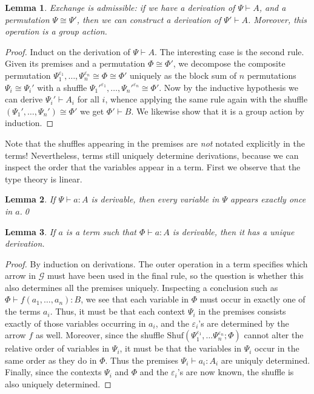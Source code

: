 \documentclass{amsart}
\let\types\vdash %
\newcommand{\e}[1]{^{\varepsilon_{#1}}}
\newcommand{\ep}{\varepsilon}
\newcommand{\shuf}{\mathrm{Shuf}}
\newcommand{\cG}{\ensuremath{\mathcal{G}}}
\newtheorem{lem}{Lemma}
\theoremstyle{definition}
\begin{document}
\begin{lem}
  Exchange is admissible: if we have a derivation of $\Psi\types A$, and a permutation $\Psi\cong \Psi'$, then we can construct a derivation of $\Psi'\types A$.
  Moreover, this operation is a group action.
\end{lem}
\begin{proof}
  Induct on the derivation of $\Psi\types A$.
  The interesting case is the second rule.
  Given its premises and a permutation $\Phi\cong\Phi'$, we decompose the composite permutation $\Psi_1\e1,\dots,\Psi_n\e n\cong \Phi\cong\Phi'$ uniquely as the block sum of $n$ permutations $\Psi_i\cong \Psi_i'$ with a shuffle ${\Psi_1'}\e1,\dots,{\Psi_n'}\e n \cong \Phi'$.
  Now by the inductive hypothesis we can derive $\Psi_i'\types A_i$ for all $i$, whence applying the same rule again with the shuffle $(\Psi_1',\dots,\Psi_n') \cong \Phi'$ we get $\Phi' \types B$.
  We likewise show that it is a group action by induction.
\end{proof}

Note that the shuffles appearing in the premises are \emph{not} notated explicitly in the terms!
Nevertheless, terms still uniquely determine derivations, because we can inspect the order that the variables appear in a term.
First we observe that the type theory is linear.

\begin{lem}\label{thm:term-linear}
  If $\Psi\types a:A$ is derivable, then every variable in $\Psi$ appears exactly once in $a$.\qed
\end{lem}

\begin{lem}\label{thm:term-deriv}
  If $a$ is a term such that $\Phi\types a:A$ is derivable, then it has a unique derivation.
\end{lem}
\begin{proof}
  By induction on derivations.
  The outer operation in a term specifies which arrow in $\cG$ must have been used in the final rule, so the question is whether this also determines all the premises uniquely.
  Inspecting a conclusion such as $\Phi \types f(a_1,\dots,a_n) : B$, we see that each variable in $\Phi$ must occur in exactly one of the terms $a_i$.
  Thus, it must be that each context $\Psi_i$ in the premises consists exactly of those variables occurring in $a_i$, and the $\ep_i$'s are determined by the arrow $f$ as well.
  Moreover, since the shuffle $\shuf(\Psi_1\e1,\dots\Psi_n\e n;\Phi)$ cannot alter the relative order of variables in $\Psi_i$, it must be that the variables in $\Psi_i$ occur in the same order as they do in $\Phi$.
  Thus the premises $\Psi_i\types a_i:A_i$ are uniquly determined.
  Finally, since the contexts $\Psi_i$ and $\Phi$ and the $\ep_i$'s are now known, the shuffle is also uniquely determined.
\end{proof}
\end{document}
